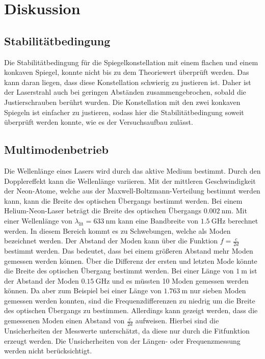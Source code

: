 \section{Diskussion}
\label{sec:Diskussion}

\subsection{Stabilitätbedingung}
Die Stabilitätbedingung für die Spiegelkonstellation mit einem flachen und einem konkaven Spiegel, konnte 
nicht bis zu dem Theoriewert überprüft werden. Das kann daran liegen, dass diese Konstellation schwierig zu 
justieren ist. Daher ist der Laserstrahl auch bei geringen Abständen zusammengebrochen, sobald die Justierschrauben 
berührt wurden. Die Konstellation mit den zwei konkaven Spiegeln ist einfacher zu justieren, sodass hier die Stabilitätbedingung
soweit überprüft werden konnte, wie es der Versuchsaufbau zulässt.

\subsection{Multimodenbetrieb}
Die Wellenlänge eines Lasers wird durch das aktive Medium bestimmt. Durch den Dopplereffekt kann die Wellenlänge variieren.
Mit der mittleren Geschwindigkeit der Neon-Atome, welche aus der Maxwell-Boltzmann-Verteilung bestimmt werden kann, kann 
die Breite des optischen Übergangs bestimmt werden. Bei einem Helium-Neon-Laser beträgt die Breite des optischen Übergangs $\SI{0.002}{\nano\meter}$.
Mit einer Wellenlänge von $\lambda_{\text{lit}}=\SI{633}{\nano\meter}$ 
\cite{leifi} kann eine Bandbreite von $\SI{1.5}{\giga\hertz}$ berechnet werden. In diesem Bereich kommt es zu Schwebungen,
welche als Moden bezeichnet werden. Der Abstand der Moden kann über die Funktion $f=\frac{c}{2d}$ bestimmt werden. Das bedeutet, 
dass bei einem größeren Abstand mehr Moden gemessen werden können. Über die Differenz der ersten und letzten Mode könnte die 
Breite des optischen Übergang bestimmt werden. Bei einer Länge von $\SI{1}{\meter}$ ist der Abstand der Moden $\SI{0.15}{\giga\hertz}$
und es müssten 10 Moden gemessen werden können. Da aber zum Beispiel bei einer Länge von $\SI{1.763}{\meter}$ nur sieben Moden gemessen werden konnten,
sind die Frequenzdifferenzen zu niedrig um die Breite des optischen Übergangs zu bestimmen. Allerdings kann gezeigt werden, dass
die gemessenen Moden einen Abstand von $\frac{c}{2d}$ aufweisen. Hierbei sind die Unsicherheiten der Messwerte unterschätzt, 
da diese nur durch die Fitfunktion erzeugt werden. Die Unsicherheiten von der Längen- oder Frequenzmessung werden 
nicht berücksichtigt.

